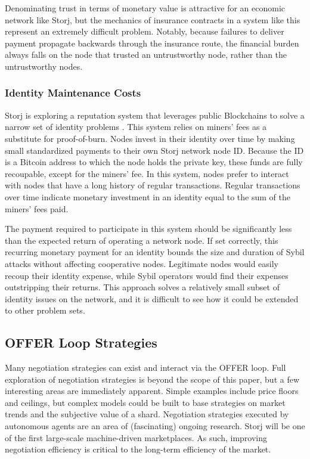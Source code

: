 \documentclass[a4paper,10pt]{article}
\begin{document}
Denominating trust in terms of monetary value is attractive for an economic network like Storj, but the mechanics of insurance contracts in a system like this represent an extremely difficult problem.  Notably, because failures to deliver payment propagate backwards through the insurance route, the financial burden always falls on the node that trusted an untrustworthy node, rather than the untrustworthy nodes.

\subsubsection{Identity Maintenance Costs}
Storj is exploring a reputation system that leverages public Blockchains to solve a narrow set of identity problems \cite{23}. This system relies on miners’ fees as a substitute for proof-of-burn. Nodes invest in their identity over time by making small standardized payments to their own Storj network node ID. Because the ID is a Bitcoin address to which the node holds the private key, these funds are fully recoupable, except for the miners’ fee. In this system, nodes prefer to interact with nodes that have a long history of regular transactions. Regular transactions over time indicate monetary investment in an identity equal to the sum of the miners’ fees paid.

The payment required to participate in this system should be significantly less than the expected return of operating a network node. If set correctly, this recurring monetary payment for an identity bounds the size and duration of Sybil attacks without affecting cooperative nodes. Legitimate nodes would easily recoup their identity expense, while Sybil operators would find their expenses outstripping their returns. This approach solves a relatively small subset of identity issues on the network, and it is difficult to see how it could be extended to other problem sets.

\subsection{OFFER Loop Strategies}
Many negotiation strategies can exist and interact via the OFFER loop. Full exploration of negotiation strategies is beyond the scope of this paper, but a few interesting areas are immediately apparent. Simple examples include price floors and ceilings, but complex models could be built to base strategies on market trends and the subjective value of a shard. Negotiation strategies executed by autonomous agents are an area of (fascinating) ongoing research. Storj will be one of the first large-scale machine-driven marketplaces. As such, improving negotiation efficiency is critical to the long-term efficiency of the market.
\end{document}
